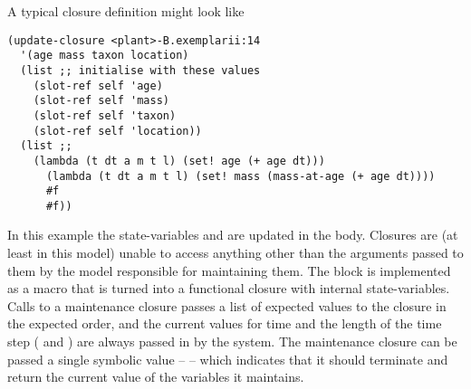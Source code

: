 A typical closure definition might look like
\begin{verbatim}
(update-closure <plant>-B.exemplarii:14 
  '(age mass taxon location)
  (list ;; initialise with these values
    (slot-ref self 'age)
    (slot-ref self 'mass)
    (slot-ref self 'taxon)
    (slot-ref self 'location))
  (list ;; 
    (lambda (t dt a m t l) (set! age (+ age dt)))
      (lambda (t dt a m t l) (set! mass (mass-at-age (+ age dt))))
      #f
      #f))

\end{verbatim}
In this example the state-variables  and 
are updated in the body.  Closures are (at least in this model) unable
to access anything other than the arguments passed to them by the
model responsible for maintaining them.  The 
block is implemented as a macro that is turned into a functional
closure with internal state-variables.  Calls to a maintenance closure
passes a list of expected values to the closure in the expected
order, and the current values for time and the length of the time
step ( and ) are
always passed in by the system.  The maintenance closure can be passed
a single symbolic value --  -- which indicates that it
should terminate and return the current value of the variables it maintains.





